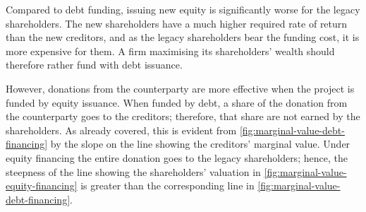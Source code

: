 \documentclass[main.tex]{subfiles}
\begin{document}
        Compared to debt funding, 
        issuing new equity is significantly worse for the legacy shareholders.
        The new shareholders have a much higher required rate of return than the new creditors,
        and as the legacy shareholders bear the funding cost, it is more expensive for them.
        A firm maximising its shareholders' wealth should therefore rather fund with debt issuance.

        However, donations from the counterparty are more effective
        when the project is funded by equity issuance.
        When funded by debt, a share of the donation from the counterparty goes to the creditors;
        therefore, that share are not earned by the shareholders.
        As already covered, this is evident from \cref{fig:marginal-value-debt-financing}
        by the slope on the line showing the creditors' marginal value.
        Under equity financing the entire donation goes to the legacy shareholders;
        hence, the steepness of the line showing the shareholders' valuation in 
        \cref{fig:marginal-value-equity-financing} is greater than the corresponding line in 
        \cref{fig:marginal-value-debt-financing}.
\end{document}
